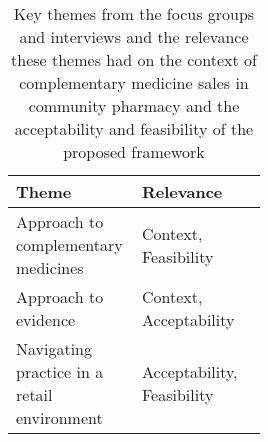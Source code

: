 \begin{table}[tbh]
\centering
\begin{tabular}{>{\raggedright}p{0.5\linewidth}l}
\hline
\textbf{Theme}                               & \textbf{Relevance}\T\B\\
\hline
Approach to complementary medicines                 & Context, Feasibility       \T\\[21pt]
Approach to evidence  & Context, Acceptability     \\[10pt]
Navigating practice in a retail environment  & Acceptability, Feasibility\B\\
\hline
\end{tabular}
\caption{Key themes from the focus groups and interviews and the relevance these themes had on the context of complementary medicine sales in community pharmacy and the acceptability and feasibility of the proposed framework}
\end{table}
